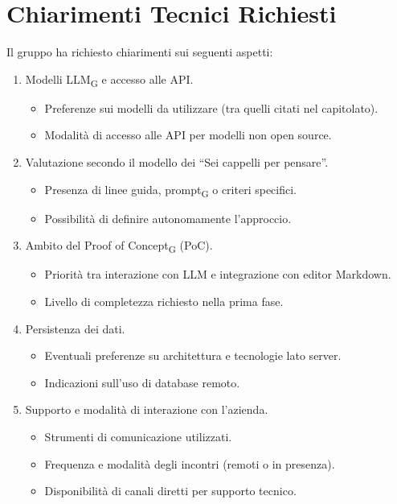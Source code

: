\section{Chiarimenti Tecnici Richiesti}
Il gruppo ha richiesto chiarimenti sui seguenti aspetti:
\begin{enumerate}
	\item Modelli LLM\textsubscript{G} e accesso alle API.
	\begin{itemize}
		\item Preferenze sui modelli da utilizzare (tra quelli citati nel capitolato).
		\item Modalità di accesso alle API per modelli non open source.
	\end{itemize}
	\item Valutazione secondo il modello dei “Sei cappelli per pensare”.
	\begin{itemize}
		\item Presenza di linee guida, prompt\textsubscript{G} o criteri specifici.
		\item Possibilità di definire autonomamente l’approccio.
	\end{itemize}
	\item Ambito del Proof of Concept\textsubscript{G} (PoC).
	\begin{itemize}
		\item Priorità tra interazione con LLM e integrazione con editor Markdown.
		\item Livello di completezza richiesto nella prima fase.
	\end{itemize}
	\item Persistenza dei dati.
	\begin{itemize}
		\item Eventuali preferenze su architettura e tecnologie lato server.
		\item Indicazioni sull’uso di database remoto.
	\end{itemize}
	\item Supporto e modalità di interazione con l’azienda.
	\begin{itemize}
		\item Strumenti di comunicazione utilizzati.
		\item Frequenza e modalità degli incontri (remoti o in presenza).
		\item Disponibilità di canali diretti per supporto tecnico.
	\end{itemize}
\end{enumerate}

